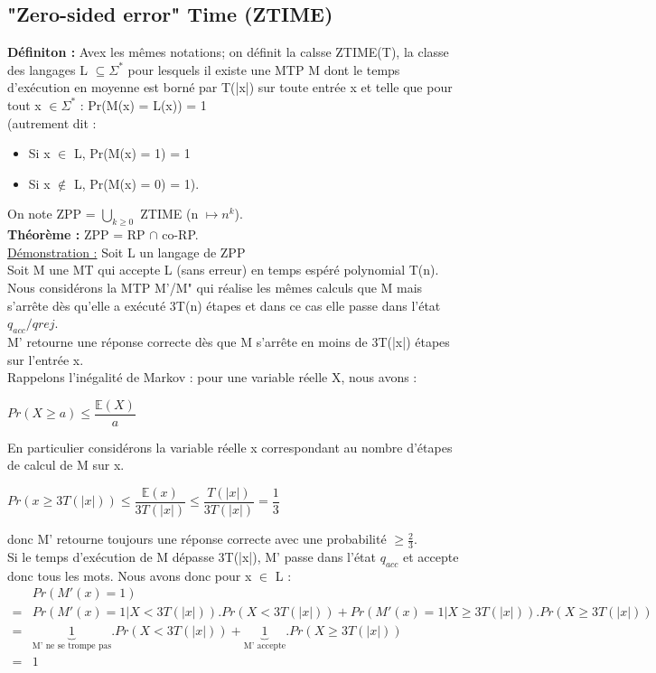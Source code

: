 \documentclass[12pt,a4paper]{article}
\begin{document}
\subsection{"Zero-sided error" Time (ZTIME)}
\textbf{Définiton :} Avex les mêmes notations; on définit la calsse ZTIME(T), la classe des langages L $\subseteq \Sigma^*$ pour lesquels il existe une MTP M dont le temps d'exécution en moyenne est borné par T(|x|) sur toute entrée x et telle que pour tout x $\in \Sigma^*$ : Pr(M(x) = L(x)) = 1\\(autrement dit :
\begin{itemize}
	\item Si x $\in$ L, Pr(M(x) = 1) = 1
	\item Si x $\not\in$ L, Pr(M(x) = 0) = 1).
\end{itemize}
On note ZPP = $\bigcup\limits_{k \geq 0}$ ZTIME (n $\longmapsto n^k$).\\
\textbf{Théorème :} ZPP = RP $\cap$ co-RP.\\
\underline{Démonstration :} Soit L un langage de ZPP\\
Soit M une MT qui accepte L (sans erreur) en temps espéré polynomial T(n).\\
Nous considérons la MTP M'/M" qui réalise les mêmes calculs que M mais s'arrête dès qu'elle a exécuté 3T(n) étapes et dans ce cas elle passe dans l'état $q_{acc}/q{rej}$.\\
M' retourne une réponse correcte dès que M s'arrête en moins de 3T(|x|) étapes sur l'entrée x.\\
Rappelons l'inégalité de Markov : pour une variable réelle X, nous avons :\\
\begin{center}
	$Pr(X \geq a) \leq \dfrac{\mathbb{E}(X)}{a}$
\end{center}
En particulier considérons la variable réelle x correspondant au nombre d'étapes de calcul de M sur x.
\begin{center}
	$Pr(x \geq 3T(|x|)) \leq \dfrac{\mathbb{E}(x)}{3T(|x|)} \leq \dfrac{T(|x|)}{3T(|x|)} = \dfrac{1}{3}$
\end{center}
donc M' retourne toujours une réponse correcte avec une probabilité $\geq \frac{2}{3}$.\\
Si le temps d'exécution de M dépasse 3T(|x|), M' passe dans l'état $q_{acc}$ et accepte donc tous les mots. Nous avons donc pour x $\in$ L :
\begin{equation}
\begin{split}\nonumber
& Pr(M'(x) = 1)\\
=& Pr(M'(x) = 1 | X < 3T(|x|)).Pr(X < 3T(|x|)) + Pr(M'(x) = 1 | X \geq 3T(|x|)).Pr(X \geq 3T(|x|))\\
=&\underbrace{1}_{\text{M' ne se trompe pas}}.Pr(X < 3T(|x|)) + \underbrace{1}_{\text{M' accepte}}.Pr(X \geq 3T(|x|))\\
=& 1
\end{split}
\end{equation}
\end{document}
